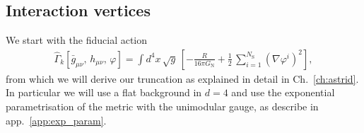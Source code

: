 \documentclass[11pt]{book}
\newcommand\bgmunu{ \bar g_{\mu\nu} }
\newcommand\hmunu{ h_{\mu\nu} }
\newcommand\NS{ N_{\scriptscriptstyle{\mathrm{S}}} }
\newcommand\GNewton{ G_{\scriptscriptstyle{\mathrm{N}}}{} }
\numberwithin{equation}{chapter}
\begin{document}
\begin{appendices}
\section{Interaction vertices}

We start with the fiducial action
\begin{align}
  \hat \Gamma_k[\bgmunu, \, \hmunu, \, \varphi] = \int d^4x \, \sqrt{g} \,
  \left[
    - \frac{R}{16 \pi \GNewton} + \frac{1}{2} \, \sum_{i=1}^{\NS} \left( \nabla\varphi^i \right)^2
  \right] ,
\end{align}
from which we will derive our truncation as explained in detail in Ch.~\ref{ch:astrid}.
In particular we will use a flat background in $d=4$ and use the
exponential parametrisation of the metric with the unimodular gauge, as
describe in app.~\ref{app:exp_param}.


\end{appendices}
\end{document}
